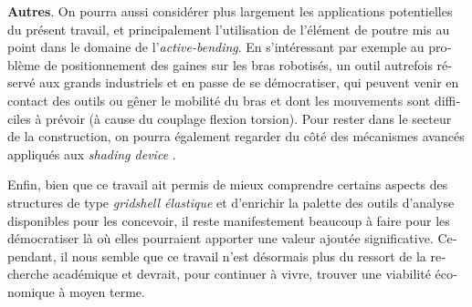 \begin{otherlanguage}{french}
    \textbf{Autres}. On pourra aussi considérer plus largement les applications potentielles du présent travail, et principalement l'utilisation de l'élément de poutre mis au point dans le domaine de l'\emph{active-bending}. En s'intéressant par exemple au problème de positionnement des gaines sur les bras robotisés, un outil autrefois réservé aux grands industriels et en passe de se démocratiser, qui peuvent venir en contact des outils ou gêner le mobilité du bras et dont les mouvements sont difficiles à prévoir (à cause du couplage flexion torsion). Pour rester dans le secteur de la construction, on pourra également regarder du côté des mécanismes avancés appliqués aux \emph{shading device} \cite{Charpentier2017}.


Enfin, bien que ce travail ait permis de mieux comprendre certains aspects des structures de type \emph{gridshell élastique} et d'enrichir la palette des outils d'analyse disponibles pour les concevoir, il reste manifestement beaucoup à faire pour les démocratiser là où elles pourraient apporter une valeur ajoutée significative. Cependant, il nous semble que ce travail n'est désormais plus du ressort de la recherche académique et devrait, pour continuer à vivre, trouver une viabilité économique à moyen terme.








\end{otherlanguage}
